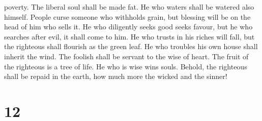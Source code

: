 poverty.  The liberal soul shall be made fat. He who
waters shall be watered also himself.  People curse
someone who withholds grain, but blessing will be on the head of him who
sells it.  He who diligently seeks good seeks favour, but
he who searches after evil, it shall come to him.  He who
trusts in his riches will fall, but the righteous shall flourish as the
green leaf.  He who troubles his own house shall inherit
the wind. The foolish shall be servant to the wise of heart.
 The fruit of the righteous is a tree of life. He who is
wise wins souls.  Behold, the righteous shall be repaid
in the earth, how much more the wicked and the sinner!

\hypertarget{section-11}{%
\section{12}\label{section-11}}


